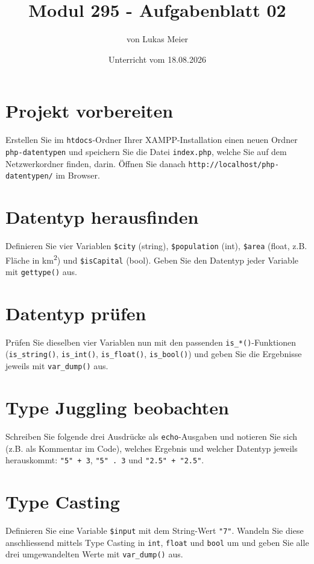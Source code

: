 \documentclass[a4paper,12pt]{article}
\title{Modul 295 - Aufgabenblatt 02}
\author{von Lukas Meier}
\date{Unterricht vom 18.08.2026}
\begin{document}
\maketitle

\section{Projekt vorbereiten}

Erstellen Sie im \texttt{htdocs}-Ordner Ihrer XAMPP-Installation einen neuen Ordner \texttt{php-datentypen} und speichern Sie die Datei \texttt{index.php}, welche Sie auf dem Netzwerkordner finden, darin. Öffnen Sie danach \texttt{http://localhost/php-datentypen/} im Browser.

\section{Datentyp herausfinden}

Definieren Sie vier Variablen \texttt{\$city} (string), \texttt{\$population} (int), \texttt{\$area} (float, z.B. Fläche in km\textsuperscript{2}) und \texttt{\$isCapital} (bool). Geben Sie den Datentyp jeder Variable mit \texttt{gettype()} aus.

\section{Datentyp prüfen}

Prüfen Sie dieselben vier Variablen nun mit den passenden \texttt{is\_*()}-Funktionen (\texttt{is\_string()}, \texttt{is\_int()}, \texttt{is\_float()}, \texttt{is\_bool()}) und geben Sie die Ergebnisse jeweils mit \texttt{var\_dump()} aus.

\section{Type Juggling beobachten}

Schreiben Sie folgende drei Ausdrücke als \texttt{echo}-Ausgaben und notieren Sie sich (z.B. als Kommentar im Code), welches Ergebnis und welcher Datentyp jeweils herauskommt: \texttt{"5" + 3}, \texttt{"5" . 3} und \texttt{"2.5" + "2.5"}.

\section{Type Casting}

Definieren Sie eine Variable \texttt{\$input} mit dem String-Wert \texttt{"7"}. Wandeln Sie diese anschliessend mittels Type Casting in \texttt{int}, \texttt{float} und \texttt{bool} um und geben Sie alle drei umgewandelten Werte mit \texttt{var\_dump()} aus.
\end{document}
